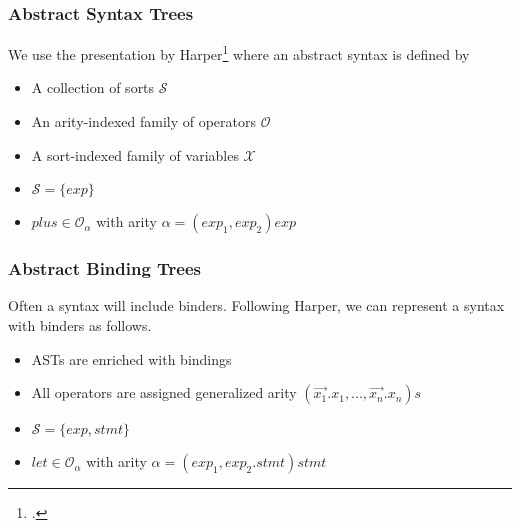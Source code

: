 \documentclass[t,24pt,aspectratio=169]{beamer}
\begin{document}
\begin{frame}
  \frametitle{Abstract Syntax Trees}

  We use the presentation by Harper\footcite{harper} where an abstract
  syntax is defined by
  
    \begin{multicols}{2}
        \begin{itemize}
            \item A collection of sorts $\mathcal{S}$
            \item An arity-indexed family of operators $\mathcal{O}$
            \item A sort-indexed family of variables $\mathcal{X}$
        \end{itemize}

        \columnbreak
        \pause
        \begin{itemize}
            \item $\mathcal{S} = \{ exp \}$
            \item $plus \in \mathcal{O}_\alpha$ with arity $\alpha = (exp_1,exp_2)exp$
        \end{itemize}

    \end{multicols}

\end{frame}

\begin{frame}
  \frametitle{Abstract Binding Trees}

  Often a syntax will include binders. Following Harper, we can
  represent a syntax with binders as follows.
  
    \begin{multicols}{2}
        \begin{itemize}
            \item ASTs are enriched with bindings
            \item All operators are assigned generalized arity $(\vec{x_1}.x_1,...,\vec{x_n}.x_n)s$
        \end{itemize}
        \columnbreak
        \pause
        \begin{itemize}
            \item $\mathcal{S} = \{ exp, stmt \}$
            \item $let \in \mathcal{O}_\alpha$ with arity $\alpha = (exp_1,exp_2.stmt)stmt$
        \end{itemize}
    \end{multicols}

\end{frame}
\end{document}
